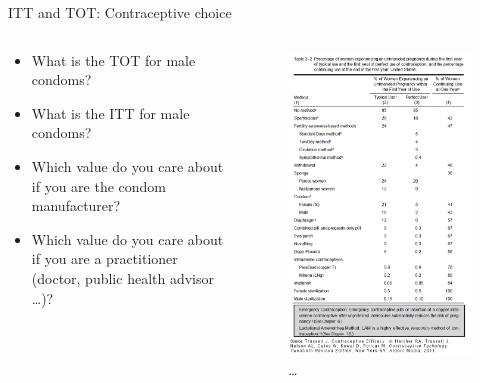 \documentclass[
  ignorenonframetext,
]{beamer}
\begin{document}
\begin{frame}{ITT and TOT: Contraceptive choice}
\protect\hypertarget{itt-and-tot-contraceptive-choice}{}
\begin{columns}[T]
\begin{column}{0.4\textwidth}
\small

\begin{itemize}
\item
  What is the TOT for male condoms?
\item
  What is the ITT for male condoms?
\item
  Which value do you care about if you are the condom manufacturer?
\item
  Which value do you care about if you are a practitioner (doctor,
  public health advisor \ldots)?
\end{itemize}
\end{column}

\begin{column}{0.6\textwidth}
\begin{figure}
\centering
\includegraphics{"images/contraceptivefailure.png"}
\caption{\ldots{}}
\end{figure}
\end{column}
\end{columns}
\end{frame}
\end{document}
